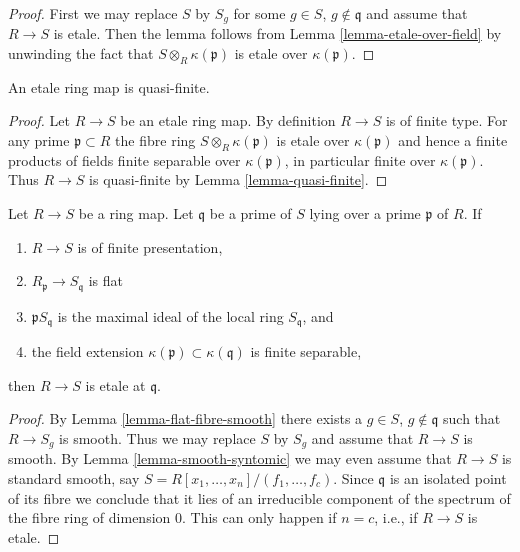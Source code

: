\begin{proof}
First we may replace $S$ by $S_g$ for some $g \in S$, $g \not \in \mathfrak q$
and assume that $R \to S$ is etale. Then the lemma follows from
Lemma \ref{lemma-etale-over-field} by unwinding the
fact that $S \otimes_R \kappa(\mathfrak p)$ is etale over
$\kappa(\mathfrak p)$.
\end{proof}

\begin{lemma}
\label{lemma-etale-quasi-finite}
An etale ring map is quasi-finite.
\end{lemma}

\begin{proof}
Let $R \to S$ be an etale ring map. By definition $R \to S$ is of finite type.
For any prime $\mathfrak p \subset R$ the fibre ring
$S \otimes_R \kappa(\mathfrak p)$ is etale over $\kappa(\mathfrak p)$
and hence a finite products of fields finite separable over
$\kappa(\mathfrak p)$, in particular finite over $\kappa(\mathfrak p)$.
Thus $R \to S$ is quasi-finite by Lemma \ref{lemma-quasi-finite}.
\end{proof}

\begin{lemma}
\label{lemma-characterize-etale}
Let $R \to S$ be a ring map. Let $\mathfrak q$ be a prime of $S$
lying over a prime $\mathfrak p$ of $R$. If
\begin{enumerate}
\item $R \to S$ is of finite presentation,
\item $R_{\mathfrak p} \to S_{\mathfrak q}$ is flat
\item $\mathfrak p S_{\mathfrak q}$ is the maximal ideal
of the local ring $S_{\mathfrak q}$, and
\item the field extension $\kappa(\mathfrak p) \subset \kappa(\mathfrak q)$
is finite separable,
\end{enumerate}
then $R \to S$ is etale at $\mathfrak q$.
\end{lemma}

\begin{proof}
By Lemma \ref{lemma-flat-fibre-smooth}
there exists a $g \in S$, $g \not \in \mathfrak q$
such that $R \to S_g$ is smooth. Thus we may replace $S$ by $S_g$ and
assume that $R \to S$ is smooth. By
Lemma \ref{lemma-smooth-syntomic} we may even assume that
$R \to S$ is standard smooth, say $S = R[x_1, \ldots, x_n]/(f_1, \ldots, f_c)$.
Since $\mathfrak q$ is an isolated point of its fibre we conclude
that it lies of an irreducible component of the spectrum of the
fibre ring of dimension $0$. This can only happen if $n = c$, i.e.,
if $R \to S$ is etale.
\end{proof}

